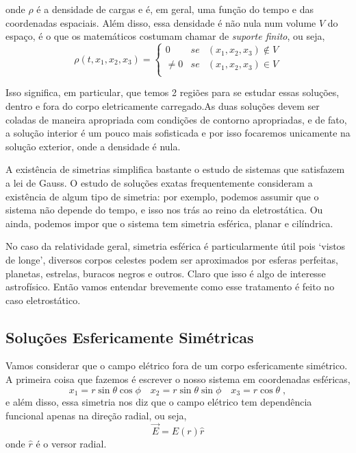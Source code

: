 \documentclass[11pt]{article}
\begin{document}
onde \(\rho\) é a densidade de cargas e é, em geral, uma função do tempo
e das coordenadas espaciais. Além disso, essa densidade é não nula num
volume \(V\) do espaço, é o que os matemáticos costumam chamar de
\emph{suporte finito}, ou seja,
\[\tag{2.2} \rho(t, x_1, x_2, x_3) = \left\{\begin{array}{lll}
 0 &se& (x_1, x_2, x_3) \notin V \\
 \neq 0 &se& (x_1, x_2, x_3) \in V \\
\end{array}\right. \]

Isso significa, em particular, que temos 2 regiões para se estudar essas
soluções, dentro e fora do corpo eletricamente carregado.As duas
soluções devem ser coladas de maneira apropriada com condições de
contorno apropriadas, e de fato, a solução interior é um pouco mais
sofisticada e por isso focaremos unicamente na solução exterior, onde a
densidade é nula.

A existência de simetrias simplifica bastante o estudo de sistemas que
satisfazem a lei de Gauss. O estudo de soluções exatas frequentemente
consideram a existência de algum tipo de simetria: por exemplo, podemos
assumir que o sistema não depende do tempo, e isso nos trás ao reino da
eletrostática. Ou ainda, podemos impor que o sistema tem simetria
esférica, planar e cilíndrica.

No caso da relatividade geral, simetria esférica é particularmente útil
pois `vistos de longe', diversos corpos celestes podem ser aproximados
por esferas perfeitas, planetas, estrelas, buracos negros e outros.
Claro que isso é algo de interesse astrofísico. Então vamos entendar
brevemente como esse tratamento é feito no caso eletrostático.

    \hypertarget{soluuxe7uxf5es-esfericamente-simuxe9tricas}{%
\subsection{Soluções Esfericamente
Simétricas}\label{soluuxe7uxf5es-esfericamente-simuxe9tricas}}

    Vamos considerar que o campo elétrico fora de um corpo esfericamente
simétrico. A primeira coisa que fazemos é escrever o nosso sistema em
coordenadas esféricas,
\[\tag{2.3} x_1 = r \sin\theta \cos\phi\quad x_2 = r \sin\theta \sin\phi\quad  x_3 = r \cos\theta\; ,\]
e além disso, essa simetria nos diz que o campo elétrico tem dependência
funcional apenas na direção radial, ou seja,
\[ \tag{2.4} \vec{E} = E(r) \hat{r}\] onde \(\hat{r}\) é o versor
radial.
\end{document}
